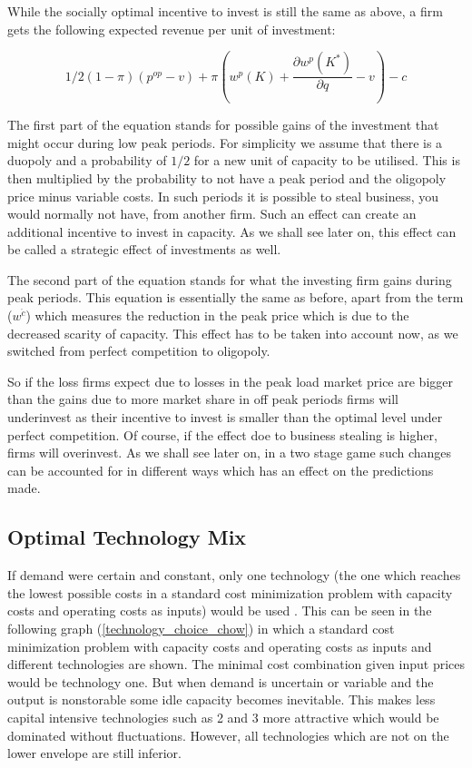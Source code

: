 While the socially optimal incentive to invest is still the same as above, a firm gets the following expected revenue per unit of investment:

\begin{equation}
	1/2 (1-\pi) (p^{op}-v) + \pi (w^p(K)+\frac{\partial w^p(K^*)}{\partial q}-v) - c
\end{equation}

The first part of the equation stands for possible gains of the investment that might occur during low peak periods. For simplicity we assume that there is a duopoly and a probability of $1/2$ for a new unit of capacity to be utilised. This is then multiplied by the probability to not have a peak period and the oligopoly price minus variable costs. In such periods it is possible to steal business, you would normally not have, from another firm. Such an effect can create an additional incentive to invest in capacity. As we shall see later on, this effect can be called a strategic effect of investments as well.

The second part of the equation stands for what the investing firm gains during peak periods. This equation is essentially the same as before, apart from the term ($w^{\acute{c}}$) which measures the reduction in the peak price which is due to the decreased scarity of capacity. This effect has to be taken into account now, as we switched from perfect competition to oligopoly.

So if the loss firms expect due to losses in the peak load market price are bigger than the gains due to more market share in off peak periods firms will underinvest as their incentive to invest is smaller than the optimal level under perfect competition. Of course, if the effect doe to business stealing is higher, firms will overinvest. As we shall see later on, in a two stage game such changes can be accounted for in different ways which has an effect on the predictions made.

\subsection{Optimal Technology Mix}

If demand were certain and constant, only one technology (the one which reaches the lowest possible costs in a standard cost minimization problem with capacity costs and operating costs as inputs) would be used \citep[see][pg. 183]{Chow1983}. This can be seen in the following graph (\ref{technology_choice_chow}) in which a standard cost minimization problem with capacity costs and operating costs as inputs and different technologies are shown. The minimal cost combination given input prices would be technology one. But when demand is uncertain or variable and the output is nonstorable some idle capacity becomes inevitable. This makes less capital intensive technologies such as 2 and 3 more attractive which would be dominated without fluctuations. However, all technologies which are not on the lower envelope are still inferior.

